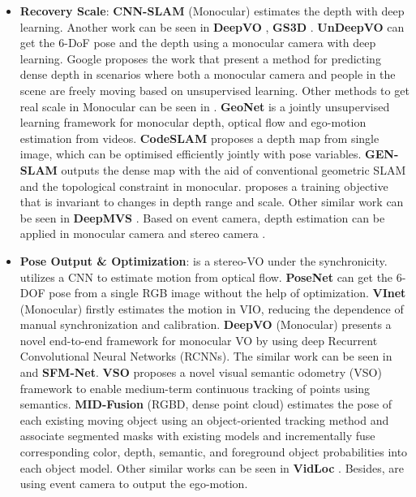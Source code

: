 \documentclass[journal,transmag]{IEEEtran}
\begin{document}
\begin{itemize}
    \item \textbf{Recovery Scale}: \textbf{CNN-SLAM} (Monocular) \cite{tateno2017cnn} estimates the depth with deep learning. Another work can be seen in \textbf{DeepVO} \cite{mohanty2016deepvo}, \textbf{GS3D} \cite{li2019gs3d} . \textbf{UnDeepVO} \cite{li2018undeepvo} can get the 6-DoF pose and the depth using a monocular camera with deep learning. Google proposes the work \cite{li2019learning} that present a method for predicting dense depth in scenarios where both a monocular camera and people in the scene are freely moving based on unsupervised learning. Other methods to get real scale in Monocular can be seen in \cite{8353862}\cite{Sucar2017Bayesian}. \textbf{GeoNet} \cite{yin2018geonet} is a jointly unsupervised learning framework for monocular depth, optical flow and ego-motion estimation from videos. \textbf{CodeSLAM} \cite{bloesch2018codeslam} proposes a depth map from single image, which can be optimised efficiently jointly with pose variables.  \textbf{GEN-SLAM} \cite{chakravarty2019gen} outputs the dense map with the aid of conventional geometric SLAM and the topological constraint in monocular. \cite{Lasinger2019} proposes a training objective that is invariant to changes in depth range and scale. Other similar work can be seen in \textbf{DeepMVS} \cite{huang2018deepmvs}. Based on event camera, depth estimation can be applied in monocular camera \cite{haessig2019spiking}\cite{gallego2018unifying} and stereo camera \cite{xie2017event}. 
    \item \textbf{Pose Output \& Optimization}:  \cite{konda2015learning} is a stereo-VO under the synchronicity. \cite{costante2015exploring} utilizes a CNN to estimate motion from optical flow. \textbf{PoseNet} \cite{kendall2015posenet} can get the 6-DOF pose from a single RGB image without the help of optimization. \textbf{VInet} (Monocular) \cite{clark2017vinet} firstly estimates the motion in VIO, reducing the dependence of manual synchronization and calibration. \textbf{DeepVO} (Monocular) \cite{wang2017deepvo} presents a novel end-to-end framework for monocular VO by using deep Recurrent Convolutional Neural Networks (RCNNs). The similar work can be seen in \cite{zhou2017unsupervised} and \textbf{SFM-Net}\cite{vijayanarasimhan2017sfm}. \textbf{VSO} \cite{Lianos2018VSO} proposes a novel visual semantic odometry (VSO) framework to enable medium-term continuous tracking of points using semantics. \textbf{MID-Fusion} (RGBD, dense point cloud) \cite{xu2018mid} estimates the pose of each existing moving object using an object-oriented tracking method and associate segmented masks with existing models and incrementally fuse corresponding color, depth, semantic, and foreground object probabilities into each object model. Other similar works can be seen in \textbf{VidLoc} \cite{clark2017vidloc}. Besides, \cite{gallego2015event}\cite{reverter2016neuromorphic} are using event camera to output the ego-motion.

\end{itemize}
\end{document}
